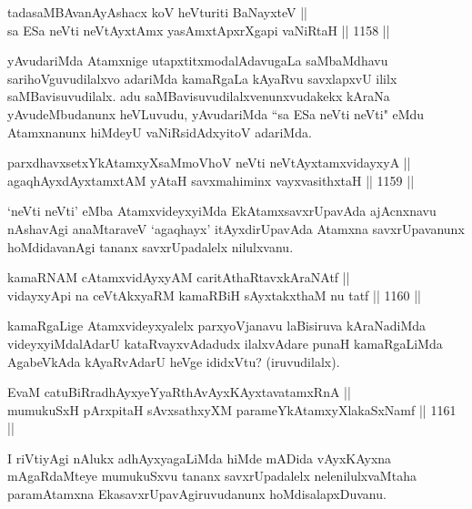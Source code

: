 \begin{shl}
tadasaMBAvanAyAshacx koV heVturiti BaNayxteV || \\
sa ESa neVti neVtAyxtAmx yasAmxtApxrXgapi vaNiRtaH \hfill || 1158 ||  
\end{shl}

\begin{artha}
yAvudariMda Atamxnige utapxtitxmodalAdavugaLa saMbaMdhavu sarihoVguvudilalxvo adariMda kamaRgaLa kAyaRvu savxlapxvU ililx saMBavisuvudilalx. adu saMBavisuvudilalxvenunxvudakekx kAraNa yAvudeMbudanunx heVLuvudu, yAvudariMda ``sa ESa neVti neVti" eMdu Atamxnanunx hiMdeyU vaNiRsidAdxyitoV adariMda.
\end{artha}

\begin{shl}
parxdhavxsetxYkAtamxyXsaMmoVhoV neVti neVtAyxtamxvidayxyA || \\
agaqhAyxdAyxtamxtAM yAtaH savxmahiminx vayxvasithxtaH \hfill || 1159 ||  
\end{shl}

\begin{artha}
`neVti neVti' eMba AtamxvideyxyiMda EkAtamxsavxrUpavAda ajAcnxnavu nAshavAgi anaMtaraveV `agaqhayx' itAyxdirUpavAda Atamxna savxrUpavanunx hoMdidavanAgi tananx savxrUpadalelx nilulxvanu.
\end{artha}


\begin{shl}
kamaRNAM cA\s \s tamxvidAyxyAM caritAthaRtavxkAraNAtf || \\
vidayxyA\s pi na ceVtAkxyaRM kamaRBiH sAyxtakxthaM nu tatf \hfill || 1160 ||  
\end{shl}

\begin{artha}
kamaRgaLige Atamxvideyxyalelx parxyoVjanavu laBisiruva kAraNadiMda videyxyiMdalAdarU kataRvayxvAdadudx ilalxvAdare punaH kamaRgaLiMda AgabeVkAda kAyaRvAdarU heVge ididxVtu? (iruvudilalx).
\end{artha}

\begin{shl}
EvaM catuBiRradhAyxyeYyaRthAvAyxKAyxtavatamxRnA || \\
mumukuSxH pArxpitaH sAvxsathxyXM parameYkAtamxyXlakaSxNamf \hfill || 1161 ||  
\end{shl}

\begin{artha}
I riVtiyAgi nAlukx adhAyxyagaLiMda hiMde mADida vAyxKAyxna mAgaRdaMteye mumukuSxvu tananx savxrUpadalelx nelenilulxvaMtaha paramAtamxna EkasavxrUpavAgiruvudanunx hoMdisalapxDuvanu.
\end{artha}

